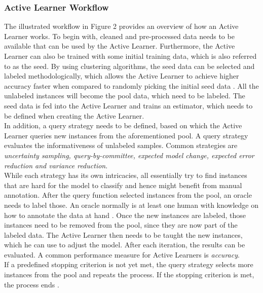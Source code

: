 \documentclass[11pt, a4paper]{article}
\begin{document}
\subsubsection{Active Learner Workflow}
The illustrated workflow in Figure 2 provides an overview of how an Active Learner works. 
To begin with, cleaned and pre-processed data needs to be available that can be used by the Active Learner. 
Furthermore, the Active Learner can also be trained with some initial training data, which is also referred to as the seed. 
By using clustering algorithms, the seed data can be selected and labeled methodologically, which allows the Active Learner to achieve 
higher accuracy faster when compared to randomly picking the initial seed data \citep{kang2004usingclusterbasedsampling}. All the unlabeled 
instances will become the pool data, which need to be labeled. The seed data is fed into the Active Learner and trains an estimator, 
which needs to be defined when creating the Active Learner.\\
In addition, a query strategy needs to be defined, based on which the Active Learner queries new instances from the aforementioned pool. 
A query strategy evaluates the informativeness of unlabeled samples. Common strategies are \emph{uncertainty sampling, query-by-committee, 
expected model change, expected error reduction and variance reduction}.\\
While each strategy has its own intricacies, all essentially try to find instances that are hard for the model to classify and hence might benefit from manual annotation. 
After the query function selected instances from the pool, an oracle needs to label those. An oracle normally is at 
least one human with knowledge on how to annotate the data at hand \citep{settles2009activeLL}. Once the new instances are labeled, 
those instances need to be removed from the pool, since they are now part of the labeled data. The Active Learner then needs 
to be taught the new instances, which he can use to adjust the model. After each iteration, the results can be evaluated. 
A common performance measure for Active Learners is \emph{accuracy}.\\
If a predefined stopping criterion is not yet met, the query strategy selects more instances from the pool and repeats the process.
If the stopping criterion is met, the process ends \citep{lu2019investigating}.
\end{document}
